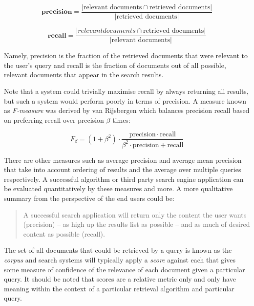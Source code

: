 \documentclass[10pt,a4paper]{report}
\begin{document}
\begin{displaymath}
  \textbf{precision} = \frac{
    |\text{relevant documents} \cap \text{retrieved documents}|
  }{
    |\text{retrieved documents}|
  }
\end{displaymath}

\begin{displaymath}
  \textbf{recall} = \frac{
    |{relevant documents} \cap \text{retrieved documents}|
  }{
    |\text{relevant documents}|
  }
\end{displaymath}

Namely, precision is the fraction of the retrieved documents that were
relevant to the user's query and recall is the fraction of documents out of
all possible, relevant documents that appear in the search results.

Note that a system could trivially maximise recall by always returning all
results, but such a system would perform poorly in terms of precision. A
measure known as \emph{F-measure} was derived by van Rijsbergen
\cite{rijsbergen1979information} which
balances precision recall based on preferring recall over precision $\beta$
times:

\begin{displaymath}
  F_\beta = (1 + \beta^2) \cdot \frac{\mathrm{precision} \cdot \mathrm{recall} }{ \beta^2 \cdot \mathrm{precision} + \mathrm{recall}}
\end{displaymath}

There are other measures such as average precision and average mean precision
that take into account ordering of results and the average over multiple
queries respectively. A successful algorithm or third party search engine
application can be evaluated quantitatively by these measures and more. A more
qualitative summary from the perspective of the end users could be:

\begin{quote}
  A successful search application will return only the content the user wants
  (precision) --
  as high up the results list as possible -- and as much of desired content
  as possible (recall).
\end{quote}

The set of all documents that could be retrieved by a query is known as the
\emph{corpus} and search systems will typically apply a \emph{score} against
each that gives some measure of confidence of the relevance of each document
given a particular query. It should be noted that scores are a relative
metric only and only have meaning within the context of a particular
retrieval algorithm and particular query.
\end{document}
